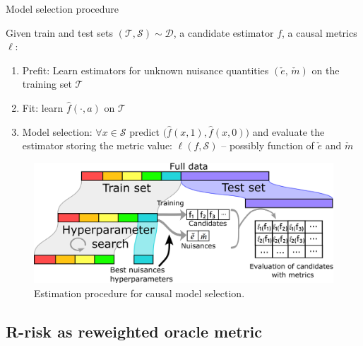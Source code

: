 \documentclass[a4paper,num-refs]{oup-contemporary}%
\begin{document}
\begin{algorithm}[!htbp]
    \caption{Model selection procedure}\label{problem:estimation_procedure:algo} {%
        Given train and test sets $(\mathcal{T}, \mathcal{S}) \sim \mathcal{D}$,
        a candidate estimator $f$, a causal
        metrics $\ell$:
        \begin{enumerate}
            \item Prefit: Learn estimators for unknown nuisance quantities $(\check e,\,\check m)$ on the training set $\mathcal{T}$
            \item Fit: learn $\hat f(\cdot, a)$ on
                  $\mathcal T$
            \item Model selection: $\forall{x} \in \mathcal{S}$ predict
                  $\big(\hat f(x, 1), \hat f(x, 0)\big)$ and evaluate the estimator storing the metric value: $\ell(f, \mathcal S)$ -- possibly
                  function of $\check e$ and $\check m$
        \end{enumerate}

    }
\end{algorithm}


\begin{figure}[h!]

    \centering\begin{minipage}{.95\linewidth}
        \includegraphics[width=\linewidth]{estimation_procedure_causal_selection_procedure.png}
    \end{minipage}
    \caption{Estimation procedure for causal model
        selection.}\label{problem:estimation_procedure:figure}
\end{figure}



\subsection{R-risk as reweighted oracle metric}\label{theory:r_risk_rewrite}
\end{document}
